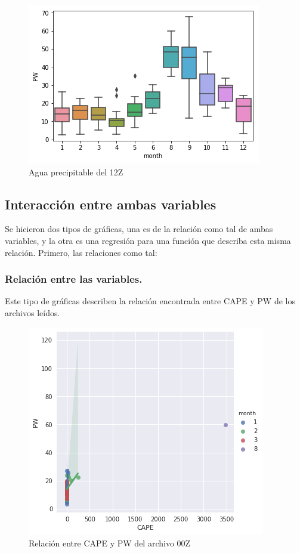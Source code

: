 \documentclass{article}
\begin{document}
\begin{figure}[H]
\includegraphics[width=\linewidth]{PW12Z.png}
\caption{Agua precipitable del 12Z}
\end{figure}

\subsection{Interacción entre ambas variables}
Se hicieron dos tipos de gráficas, una es de la relación como tal de ambas variables, y la otra es una regresión para una función que describa esta misma relación. 
Primero, las relaciones como tal: 

\subsubsection{Relación entre las variables.}
Este tipo de gráficas describen la relación encontrada entre CAPE y PW de los archivos leídos. 

\begin{figure}[H]
\includegraphics[width=\linewidth]{CAPEvPW_Otros00Z.png}
\caption{Relación entre CAPE y PW del archivo 00Z}
\end{figure}
\end{document}
